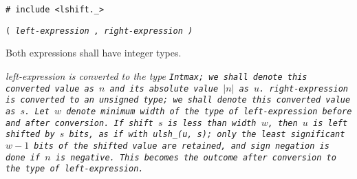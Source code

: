 
\tt{# include <lshift._>}

 \tt{(} \it{left-expression} \tt{,} \it{right-expression} \tt{)}


Both expressions shall have integer types.


\it{left-expression} is converted to the type \tt{Intmax};
we shall denote this converted value as $n$ and its absolute value $|n|$ as $u$.
\it{right-expression} is converted to an unsigned type;
we shall denote this converted value as $s$.
Let $w$ denote minimum width of the type of
\it{left-expression} before and after conversion.
If shift $s$ is less than width $w$, then $u$ is left shifted by $s$ bits,
as if with \tt{ulsh_(u, s)}; only the least significant $w - 1$ bits of the
shifted value are retained, and sign negation is done if $n$ is negative.
This becomes the outcome after conversion to the type of \it{left-expression}.
